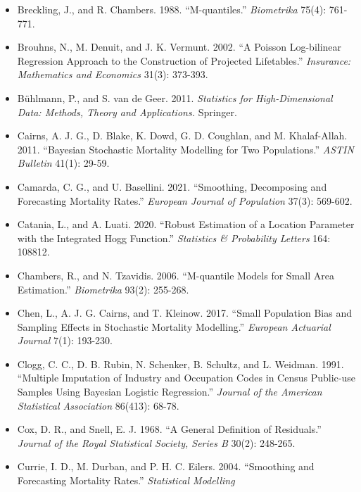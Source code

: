 \documentclass[UTF8, fontset=macnew, a4paper, 12pt]{ctexart}
\begin{document}
\begin{itemize}[leftmargin=2em, label={}, itemsep=3pt]
        ``Lee--Carter Mortality Forecasting: A Multi-country Comparison of
        Variants and Extensions.'' \textit{Demographic Research} 15: 289-310.
  \item[] Breckling, J., and R. Chambers. 1988. ``M-quantiles.''
        \textit{Biometrika} 75(4): 761-771.
  \item[] Brouhns, N., M. Denuit, and J. K. Vermunt. 2002. ``A Poisson
        Log-bilinear Regression Approach to the Construction of Projected
        Lifetables.'' \textit{Insurance: Mathematics and Economics}
        31(3): 373-393.
  \item[] B\"uhlmann, P., and S. van de Geer. 2011. \textit{Statistics for
        High-Dimensional Data: Methods, Theory and Applications.} Springer.
  \item[] Cairns, A. J. G., D. Blake, K. Dowd, G. D. Coughlan, and
        M. Khalaf-Allah. 2011. ``Bayesian Stochastic Mortality Modelling for
        Two Populations.'' \textit{ASTIN Bulletin} 41(1): 29-59.
  \item[] Camarda, C. G., and U. Basellini. 2021. ``Smoothing, Decomposing and
        Forecasting Mortality Rates.'' \textit{European Journal of Population}
        37(3): 569-602.
  \item[] Catania, L., and A. Luati. 2020. ``Robust Estimation of a Location
        Parameter with the Integrated Hogg Function.''
        \textit{Statistics \& Probability Letters} 164: 108812.
  \item[] Chambers, R., and N. Tzavidis. 2006. ``M-quantile Models for Small
        Area Estimation.'' \textit{Biometrika} 93(2): 255-268.
  \item[] Chen, L., A. J. G. Cairns, and T. Kleinow. 2017. ``Small Population
        Bias and Sampling Effects in Stochastic Mortality Modelling.''
        \textit{European Actuarial Journal} 7(1): 193-230.
  \item[] Clogg, C. C., D. B. Rubin, N. Schenker, B. Schultz, and L. Weidman.
        1991. ``Multiple Imputation of Industry and Occupation Codes in Census
        Public-use Samples Using Bayesian Logistic Regression.''
        \textit{Journal of the American Statistical Association} 86(413): 68-78.
  \item[] Cox, D. R., and Snell, E. J. 1968. ``A General Definition of Residuals.''
        \textit{Journal of the Royal Statistical Society, Series B} 30(2): 248-265.
  \item[] Currie, I. D., M. Durban, and P. H. C. Eilers. 2004. ``Smoothing
        and Forecasting Mortality Rates.'' \textit{Statistical Modelling}

\end{itemize}
\end{document}
